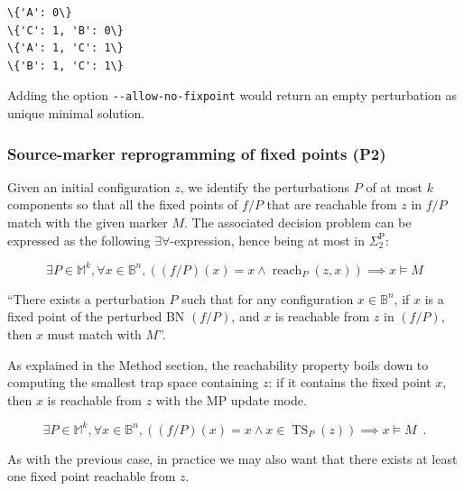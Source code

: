 \documentclass[PCJ,Unicode,screen,mode=plain]{cedram}
\begin{document}
    \begin{Verbatim}[commandchars=\\\{\}]
\{'A': 0\}
\{'C': 1, 'B': 0\}
\{'A': 1, 'C': 1\}
\{'B': 1, 'C': 1\}

    \end{Verbatim}

Adding the option \texttt{-\/-allow-no-fixpoint} would return an empty
perturbation as unique minimal solution.
\hypertarget{source-marker-reprogramming-of-fixed-points-p2}{%
\subsubsection{Source-marker reprogramming of fixed points
(P2)}\label{source-marker-reprogramming-of-fixed-points-p2}}

Given an initial configuration \(z\), we identify the perturbations
\(P\) of at most \(k\) components so that all the fixed points of
\(f/P\) that are reachable from \(z\) in \(f/P\) match with the given
marker \(M\). The associated decision problem can be expressed as the
following \(\exists\forall\)-expression, hence being at most in
\(\Sigma_2^{\mathrm P}\):

\begin{equation}
\exists P\in\mathbb M^k, \forall x\in\mathbb B^n, ((f/P)(x)=x \wedge \operatorname{reach}_P(z,x))\implies x\models M
\end{equation}

``There exists a perturbation \(P\) such that for any configuration
\(x\in\mathbb B^n\), if \(x\) is a fixed point of the perturbed BN
\((f/P)\), and \(x\) is reachable from \(z\) in \((f/P)\), then \(x\)
must match with \(M\)''.

As explained in the Method section, the reachability property boils down
to computing the smallest trap space containing \(z\): if it contains
the fixed point \(x\), then \(x\) is reachable from \(z\) with the MP
update mode.

\begin{equation}
\exists P\in\mathbb M^k, \forall x\in\mathbb B^n, ((f/P)(x)=x \wedge 
x\in\operatorname{TS}_P(z))\implies x\models M\enspace.
\end{equation}

As with the previous case, in practice we may also want that there
exists at least one fixed point reachable from \(z\).
\end{document}
